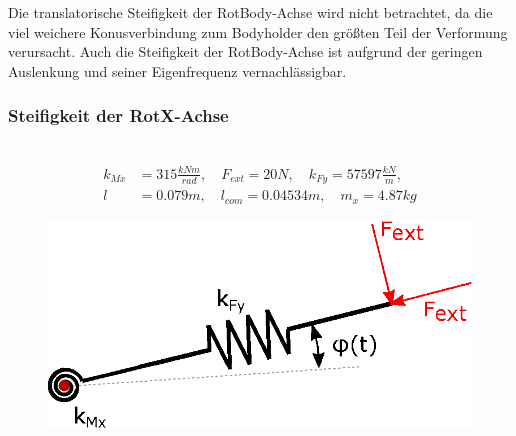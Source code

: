 \documentclass[10pt,a4paper]{iace.report}
\begin{document}
                	Die translatorische Steifigkeit der RotBody-Achse wird nicht betrachtet, da die viel weichere Konusverbindung zum Bodyholder den größten Teil der Verformung verursacht. Auch die Steifigkeit der RotBody-Achse ist aufgrund der geringen Auslenkung und seiner Eigenfrequenz vernachlässigbar. 
                	
				 \subsubsection{Steifigkeit der RotX-Achse}\leavevmode\\
					\begin{align*}
						k_{Mx} &= 315\frac{kNm}{rad}, \quad F_{ext}=20N, \quad k_{Fy} = 57597\frac{kN}{m},\\ 
						l&=0.079m, \quad l_{com}=0.04534m, \quad m_x = 4.87kg
					\end{align*}
					\begin{figure}[!h]
						\centering
						\includegraphics[width=0.4\linewidth]{./pics/rotX.eps}
					\end{figure}
\end{document}
